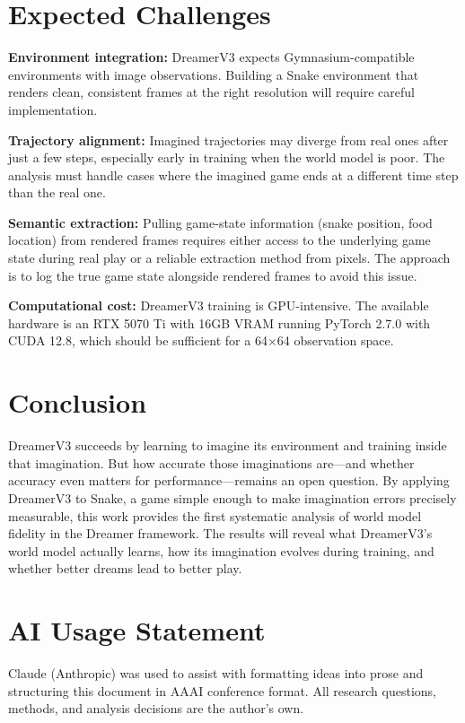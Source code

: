 \documentclass[letterpaper]{article}
\begin{document}
\section{Expected Challenges}

\textbf{Environment integration:} DreamerV3 expects Gymnasium-compatible environments with image observations. Building a Snake environment that renders clean, consistent frames at the right resolution will require careful implementation.

\textbf{Trajectory alignment:} Imagined trajectories may diverge from real ones after just a few steps, especially early in training when the world model is poor. The analysis must handle cases where the imagined game ends at a different time step than the real one.

\textbf{Semantic extraction:} Pulling game-state information (snake position, food location) from rendered frames requires either access to the underlying game state during real play or a reliable extraction method from pixels. The approach is to log the true game state alongside rendered frames to avoid this issue.

\textbf{Computational cost:} DreamerV3 training is GPU-intensive. The available hardware is an RTX 5070 Ti with 16GB VRAM running PyTorch 2.7.0 with CUDA 12.8, which should be sufficient for a 64$\times$64 observation space.

\section{Conclusion}

DreamerV3 succeeds by learning to imagine its environment and training inside that imagination. But how accurate those imaginations are---and whether accuracy even matters for performance---remains an open question. By applying DreamerV3 to Snake, a game simple enough to make imagination errors precisely measurable, this work provides the first systematic analysis of world model fidelity in the Dreamer framework. The results will reveal what DreamerV3's world model actually learns, how its imagination evolves during training, and whether better dreams lead to better play.

\section*{AI Usage Statement}

Claude (Anthropic) was used to assist with formatting ideas into prose and structuring this document in AAAI conference format. All research questions, methods, and analysis decisions are the author's own.


\end{document}
